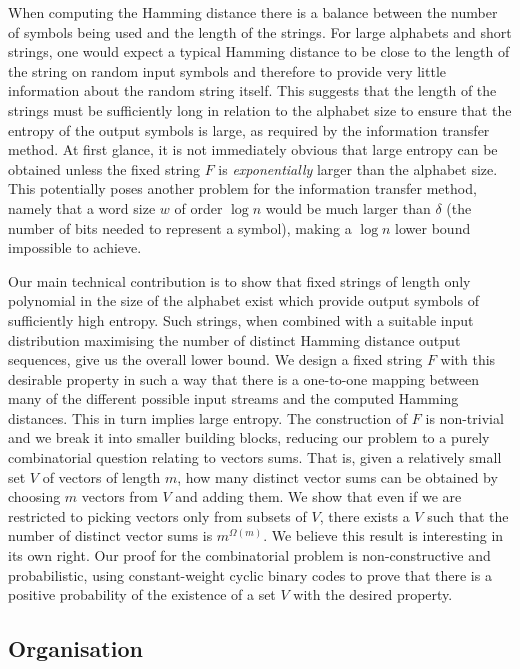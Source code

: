 \documentclass[11pt]{article}
\numberwithin{equation}{section}
\theoremstyle{definition}
\theoremstyle{plain}
\begin{document}
When computing the Hamming distance there is a balance between the number of symbols being used and the length of the strings. For large alphabets and short strings, one would expect a typical %
 Hamming distance to be close to the length of the string on random input symbols and therefore to provide very little information about the random string itself.
This suggests that the length of the strings must be sufficiently long in relation to the alphabet size to ensure that the entropy of the output symbols is large, as required by the information transfer method. At first glance, it is not immediately obvious that large entropy can be obtained unless the fixed string $F$ is \emph{exponentially} larger than the alphabet size. This potentially poses another problem for the information transfer method, namely that a word size $w$ of order $\log n$ would be much larger than $\delta$ (the number of bits needed to represent a symbol), making a $\log n$ lower bound impossible to achieve.
%
%

Our main technical contribution is to show that fixed strings of length only polynomial in the size of the alphabet exist which provide output symbols of sufficiently high entropy.  Such strings, when combined with a suitable input distribution maximising the number of distinct Hamming distance output sequences, give us the overall lower bound.
We design a fixed string $F$ with this desirable property in such a way that there is a one-to-one mapping between many of the different possible input streams and the %
computed Hamming distances. This in turn implies large entropy.
The construction of $F$ is non-trivial and we break it into smaller building blocks, reducing our problem to a purely combinatorial question relating to vectors sums.
That is, given a relatively small set $V$ of vectors of length $m$, how many distinct vector sums can be obtained by choosing $m$ vectors from $V$ and adding them. We show that even if we are restricted to picking vectors only from subsets of $V$, there exists a $V$ such that the number of distinct vector sums is  $m^{\Omega(m)}$. We believe this result is interesting in its own right. Our proof for the combinatorial problem is non-constructive and probabilistic, using
%
constant-weight   %
cyclic binary codes to prove that there is a positive probability of the existence of a set $V$ with the desired property.

%



\subsection{Organisation}
\end{document}
